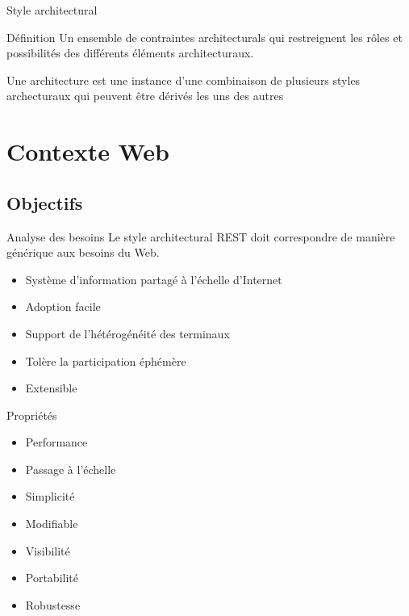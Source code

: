 \documentclass{beamer}
\begin{document}
\begin{frame}{Style architectural}
  \begin{block}{Définition}
    Un ensemble de contraintes architecturals qui restreignent les rôles
    et possibilités des différents éléments architecturaux.
  \end{block}

  \begin{block}{}
    Une architecture est une instance d'une combinaison de plusieurs
    styles archecturaux qui peuvent être dérivés les uns des autres
  \end{block}
\end{frame}

\section{Contexte Web}

\subsection{Objectifs}

\begin{frame}{Analyse des besoins}
  Le style architectural REST doit correspondre de manière générique
  aux besoins du Web.

  \begin{itemize}
  \item Système d'information partagé à l'échelle d'Internet
  \item Adoption facile
  \item Support de l'hétérogénéité des terminaux
  \item Tolère la participation éphémère
  \item Extensible
  \end{itemize}
\end{frame}

\begin{frame}{Propriétés}
  \begin{itemize}
  \item Performance
  \item Passage à l'échelle
  \item Simplicité
  \item Modifiable
  \item Visibilité
  \item Portabilité
  \item Robustesse
  \end{itemize}
\end{frame}
\end{document}
